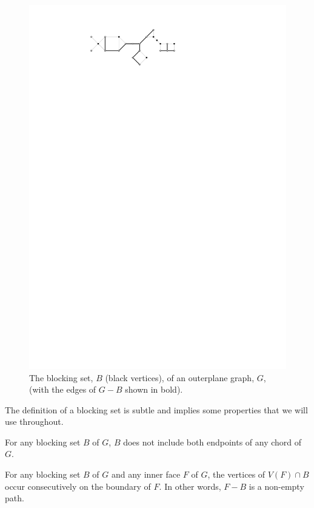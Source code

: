 \documentclass{patmorin}
\begin{document}
\begin{figure}
  \begin{center}
     \includegraphics{figs/blocking-set-1}
  \end{center}
  \caption{The blocking set, $B$ (black vertices), of an outerplane graph,
     $G$,  (with the edges of $G-B$ shown in bold).}
\end{figure}

The definition of a blocking set is subtle and implies some properties
that we will use throughout.   

\begin{obs}
   For any blocking set $B$ of $G$, $B$ does not include both endpoints
   of any chord of $G$.
\end{obs}

\begin{obs}
   For any blocking set $B$ of $G$ and any inner face $F$ of $G$, the
   vertices of $V(F)\cap B$ occur consecutively on the boundary of $F$. 
   In other words, $F-B$ is a non-empty path.
\end{obs}
\end{document}
